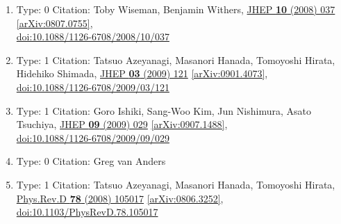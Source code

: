 \documentclass[a4paper,10pt]{article}
\begin{document}
\begin{enumerate}
\begin{enumerate}
  \item Type: 0 Citation: Toby Wiseman, Benjamin Withers, \href{https://www.doi.org/10.1088/1126-6708/2008/10/037}{JHEP {\bf 10} (2008) 037}  \href{https://arxiv.org/abs/0807.0755}{[arXiv:0807.0755]},\\\href{https://www.doi.org/10.1088/1126-6708/2008/10/037}{doi:10.1088/1126-6708/2008/10/037}
  \item Type: 1 Citation: Tatsuo Azeyanagi, Masanori Hanada, Tomoyoshi Hirata, Hidehiko Shimada, \href{https://www.doi.org/10.1088/1126-6708/2009/03/121}{JHEP {\bf 03} (2009) 121}  \href{https://arxiv.org/abs/0901.4073}{[arXiv:0901.4073]},\\\href{https://www.doi.org/10.1088/1126-6708/2009/03/121}{doi:10.1088/1126-6708/2009/03/121}
  \item Type: 1 Citation: Goro Ishiki, Sang-Woo Kim, Jun Nishimura, Asato Tsuchiya, \href{https://www.doi.org/10.1088/1126-6708/2009/09/029}{JHEP {\bf 09} (2009) 029}  \href{https://arxiv.org/abs/0907.1488}{[arXiv:0907.1488]},\\\href{https://www.doi.org/10.1088/1126-6708/2009/09/029}{doi:10.1088/1126-6708/2009/09/029}
  \item Type: 0 Citation: Greg van Anders
  \item Type: 1 Citation: Tatsuo Azeyanagi, Masanori Hanada, Tomoyoshi Hirata, \href{https://www.doi.org/10.1103/PhysRevD.78.105017}{Phys.Rev.D {\bf 78} (2008) 105017}  \href{https://arxiv.org/abs/0806.3252}{[arXiv:0806.3252]},\\\href{https://www.doi.org/10.1103/PhysRevD.78.105017}{doi:10.1103/PhysRevD.78.105017}

\end{enumerate}
\end{enumerate}
\end{document}
